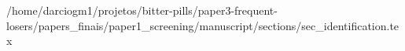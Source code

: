 /home/darciogm1/projetos/bitter-pills/paper3-frequent-losers/papers_finais/paper1_screening/manuscript/sections/sec_identification.tex